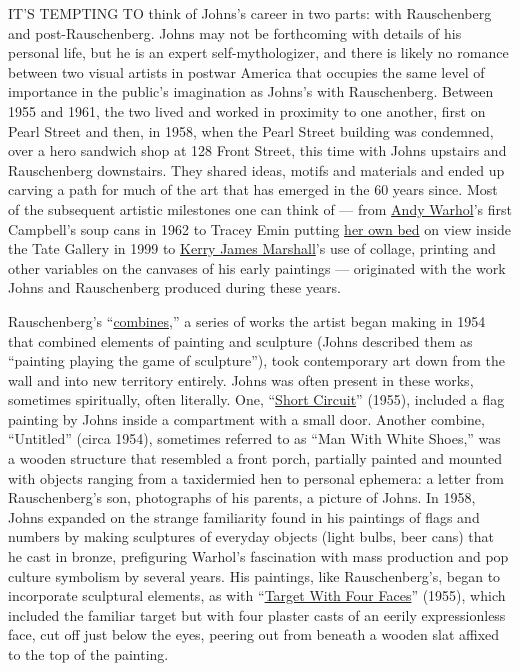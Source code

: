 IT'S TEMPTING TO think of Johns's career in two parts: with Rauschenberg
and post-Rauschenberg. Johns may not be forthcoming with details of his
personal life, but he is an expert self-mythologizer, and there is
likely no romance between two visual artists in postwar America that
occupies the same level of importance in the public's imagination as
Johns's with Rauschenberg. Between 1955 and 1961, the two lived and
worked in proximity to one another, first on Pearl Street and then, in
1958, when the Pearl Street building was condemned, over a hero sandwich
shop at 128 Front Street, this time with Johns upstairs and Rauschenberg
downstairs. They shared ideas, motifs and materials and ended up carving
a path for much of the art that has emerged in the 60 years since. Most
of the subsequent artistic milestones one can think of --- from
\href{https://www.nytimes.com/2018/11/01/arts/design/andy-warhol-inc-how-he-made-business-his-art.html}{Andy
Warhol}'s first Campbell's soup cans in 1962 to Tracey Emin putting
\href{https://www.tate.org.uk/art/artworks/emin-my-bed-l03662}{her own
bed} on view inside the Tate Gallery in 1999 to
\href{https://www.nytimes.com/2016/10/17/t-magazine/kerry-james-marshall-artist.html}{Kerry
James Marshall}'s use of collage, printing and other variables on the
canvases of his early paintings --- originated with the work Johns and
Rauschenberg produced during these years.

Rauschenberg's
``\href{https://www.rauschenbergfoundation.org/art/series/combine}{combines},''
a series of works the artist began making in 1954 that combined elements
of painting and sculpture (Johns described them as ``painting playing
the game of sculpture''), took contemporary art down from the wall and
into new territory entirely. Johns was often present in these works,
sometimes spiritually, often literally. One,
``\href{https://www.artic.edu/artworks/209926/short-circuit}{Short
Circuit}'' (1955), included a flag painting by Johns inside a
compartment with a small door. Another combine, ``Untitled'' (circa
1954), sometimes referred to as ``Man With White Shoes,'' was a wooden
structure that resembled a front porch, partially painted and mounted
with objects ranging from a taxidermied hen to personal ephemera: a
letter from Rauschenberg's son, photographs of his parents, a picture of
Johns. In 1958, Johns expanded on the strange familiarity found in his
paintings of flags and numbers by making sculptures of everyday objects
(light bulbs, beer cans) that he cast in bronze, prefiguring Warhol's
fascination with mass production and pop culture symbolism by several
years. His paintings, like Rauschenberg's, began to incorporate
sculptural elements, as with
``\href{https://www.moma.org/collection/works/78393}{Target With Four
Faces}'' (1955), which included the familiar target but with four
plaster casts of an eerily expressionless face, cut off just below the
eyes, peering out from beneath a wooden slat affixed to the top of the
painting.

